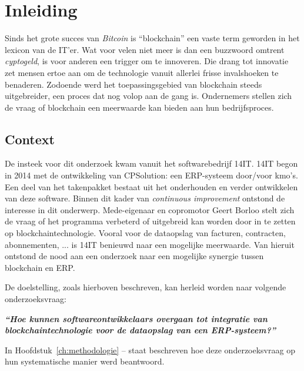 
\chapter{Inleiding}
\label{ch:inleiding}

Sinds het grote succes van \textit{Bitcoin} is ``blockchain'' een vaste term geworden in het lexicon van de IT'er. Wat voor velen niet meer is dan een buzzwoord omtrent \textit{cyptogeld}, is voor anderen een trigger om te innoveren.
Die drang tot innovatie zet mensen ertoe aan om de technologie vanuit allerlei frisse invalshoeken te benaderen. Zodoende werd het toepassingsgebied van blockchain steeds uitgebreider, een proces dat nog volop aan de gang is. Ondernemers stellen zich de vraag of blockchain een meerwaarde kan bieden aan hun bedrijfsproces.

\section{Context}
\label{sec:context}

De insteek voor dit onderzoek kwam vanuit het softwarebedrijf 14IT. 14IT begon in 2014 met de ontwikkeling van CPSolution: een ERP-systeem door/voor kmo's. Een deel van het takenpakket bestaat uit het onderhouden en verder ontwikkelen van deze software. Binnen dit kader van \textit{continuous improvement} ontstond de interesse in dit onderwerp. Mede-eigenaar en copromotor Geert Borloo stelt zich de vraag of het programma verbeterd of uitgebreid kan worden door in te zetten op blockchaintechnologie. Vooral voor de dataopslag van facturen, contracten, abonnementen, ...  is 14IT benieuwd naar een mogelijke meerwaarde. Van hieruit ontstond de nood aan een onderzoek naar een mogelijke synergie tussen blockchain en ERP. 

\pagebreak

De doelstelling, zoals hierboven beschreven, kan herleid worden naar volgende onderzoeksvraag:

\begin{center}
	\textit{\textbf{``Hoe kunnen softwareontwikkelaars overgaan tot integratie van blockchaintechnologie voor de dataopslag van een ERP-systeem?''}}
\end{center}

In Hoofdstuk~\ref{ch:methodologie} --  staat beschreven hoe deze onderzoeksvraag op hun systematische manier werd beantwoord.



